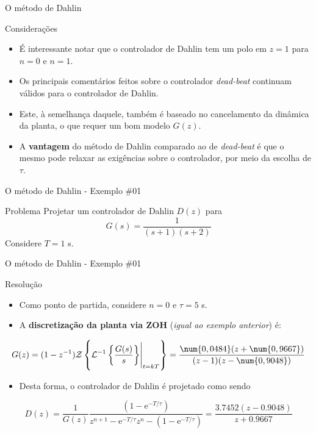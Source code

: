\begin{frame}{O método de Dahlin}
\begin{block}{Considerações}
\begin{itemize}
    \item É interessante notar que o controlador de Dahlin tem um polo em $z = 1$ para $n = 0$  e $n = 1$.
    \item Os principais comentários feitos sobre o controlador \textit{dead-beat} continuam válidos para o controlador de Dahlin. 
    \item Este, à semelhança daquele, também é baseado no  cancelamento da dinâmica da planta, o que requer um bom modelo $G(z)$.
    \item A \textbf{vantagem} do método de Dahlin comparado ao de \textit{dead-beat} é que o mesmo pode relaxar as exigências sobre o controlador, por meio da escolha de $\tau$.
\end{itemize}
\end{block}
\end{frame}

\begin{frame}{O método de Dahlin - Exemplo \#01}
\begin{block}{Problema}
	Projetar um controlador de Dahlin $ D(z) $ para $$ G(s)=\dfrac{1}{(s+1)(s+2)} $$
	Considere $T=1$ s.
\end{block}
\end{frame}

\begin{frame}{O método de Dahlin - Exemplo \#01}
\begin{block}{Resolução}
\begin{itemize}
    \item Como ponto de partida, considere $n=0$ e $\tau = 5$ s.
    \item A \textbf{discretização da planta via ZOH} (\textit{igual ao exemplo anterior}) é:
\end{itemize}
$$G(z)=(1-z^{-1})\mathcal{Z}\left\lbrace \mathcal{L}^{-1}\eval{\left\lbrace \dfrac{G(s)}{s}\right\rbrace}_{t=kT} \right\rbrace =\dfrac{\num{0,0484}(z+\num{0,9667})}{(z-1)(z-\num{0,9048})}$$
\begin{itemize}
    \item Desta forma, o controlador de Dahlin é projetado como sendo
\end{itemize}
$$D(z) = \dfrac{1}{G(z)} \dfrac{(1-\text{e}^{-T/\tau})}{z^{n+1}-\text{e}^{-T/\tau}z^n - (1-\text{e}^{-T/\tau})} = \dfrac{\num{3,7452}(z-\num{0,9048})}{z+\num{0,9667}}$$
\end{block}
\end{frame}

